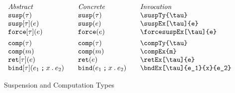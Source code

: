 \documentclass[11pt]{article}
\begin{document}
\begin{figure}

  \begin{small}
    \begin{displaymath}
      \begin{array}{l@{\qquad}l@{\qquad}l@{\qquad}l}
        \textit{Abstract} & \textit{Concrete} & \textit{Invocation} \\
        \suspTy{\tau}           & \suspTy*{\tau}           & \verb|\suspTy{\tau}|           \\
        \suspEx[\tau]{e}        & \suspEx*[\tau]{e}        & \verb|\suspEx[\tau]{e}|        \\
        \forcesuspEx[\tau]{e}   & \forcesuspEx*[\tau]{e}   & \verb|\forcesuspEx[\tau]{e}|   \\[1ex]

        \compTy{\tau}           & \compTy*{\tau}           & \verb|\compTy{\tau}|           \\
        \compEx{m}              & \compEx*{m}              & \verb|\compEx{m}|              \\
        \retEx[\tau]{e}         & \retEx*[\tau]{e}         & \verb|\retEx[\tau]{e}|         \\
        \bndEx[\tau]{e_1}{x}{e_2} & \bndEx*[\tau]{e_1}{x}{e_2} & \verb|\bndEx[\tau]{e_1}{x}{e_2}|
    \end{array}
    \end{displaymath}
  \end{small}

  \caption{Suspension and Computation Types}
  \label{fig:comp-susp}
\end{figure}
\end{document}
